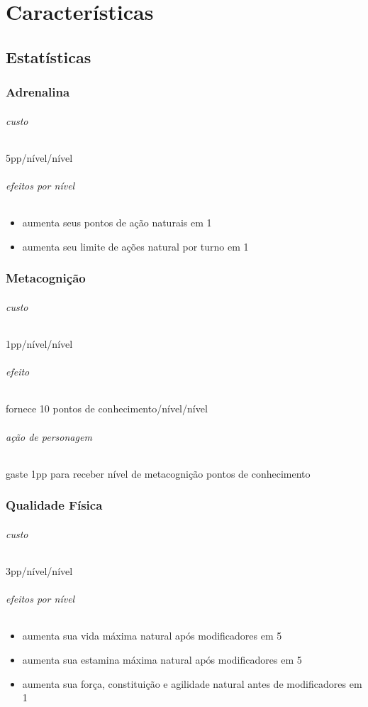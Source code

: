 \clearpage{}
\part{Características}
\clearpage{}
\chapter{Estatísticas}
\section{Adrenalina}
\paragraph{custo} 5pp/nível/nível
\paragraph{efeitos por nível} 
\begin{itemize}
  \item aumenta seus pontos de ação naturais em 1 
  \item aumenta seu limite de ações natural por turno em 1 
\end{itemize}
%
%
\section{Metacognição}
\paragraph{custo} 1pp/nível/nível
\paragraph{efeito} fornece 10 pontos de conhecimento/nível/nível
\paragraph{ação de personagem} gaste 1pp para receber nível de metacognição pontos de conhecimento
%
%
\section{Qualidade Física}
\paragraph{custo} 3pp/nível/nível
\paragraph{efeitos por nível} 
\begin{itemize}
    \item aumenta sua vida máxima natural após modificadores em 5
    \item aumenta sua estamina máxima natural após modificadores em 5
    \item aumenta sua força, constituição e agilidade natural antes de modificadores em 1
\end{itemize}
%
%
